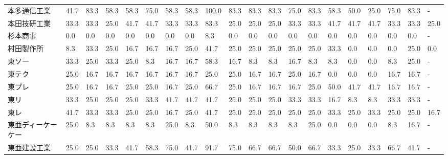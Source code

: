 \documentclass[a4paper，11pt]{jsarticle}
\begin{document}
\begin{longtable}[c]{lp{3mm}p{3mm}p{3mm}p{3mm}p{3mm}p{3mm}p{3mm}p{3mm}p{3mm}p{3mm}p{3mm}p{3mm}p{3mm}p{3mm}p{3mm}p{3mm}p{3mm}p{3mm}p{3mm}}
本多通信工業          &   41.7 &   83.3 &      58.3 &      58.3 &       75.0 &   58.3 &   58.3 &  100.0 &    83.3 &    83.3 &   83.3 &  75.0 &   83.3 &    58.3 &    50.0 &  25.0 &  75.0 &  83.3 &     - \\
本田技研工業          &   33.3 &   33.3 &      25.0 &      41.7 &       41.7 &   33.3 &   33.3 &   83.3 &    25.0 &    25.0 &   25.0 &  33.3 &   33.3 &    41.7 &    41.7 &  41.7 &  33.3 &  33.3 &  25.0 \\
杉本商事            &    0.0 &    0.0 &       0.0 &       0.0 &        0.0 &    0.0 &    0.0 &    8.3 &     0.0 &     0.0 &    0.0 &   0.0 &    0.0 &     0.0 &     0.0 &   0.0 &   0.0 &   0.0 &     - \\
村田製作所           &    8.3 &   33.3 &      25.0 &      16.7 &       16.7 &   16.7 &   25.0 &   41.7 &    25.0 &    25.0 &   25.0 &  25.0 &   25.0 &    33.3 &     0.0 &   0.0 &   0.0 &  25.0 &   0.0 \\
東ソー             &   33.3 &   25.0 &      33.3 &      25.0 &        8.3 &   16.7 &   16.7 &   58.3 &    16.7 &     8.3 &    8.3 &  16.7 &    8.3 &     8.3 &     0.0 &   0.0 &   8.3 &  25.0 &     - \\
東テク             &   25.0 &   16.7 &      16.7 &      16.7 &       16.7 &   16.7 &   16.7 &   25.0 &    25.0 &    16.7 &   16.7 &  25.0 &   16.7 &     0.0 &     0.0 &   0.0 &  16.7 &  16.7 &     - \\
東プレ             &   25.0 &   16.7 &      16.7 &      25.0 &       25.0 &   16.7 &   25.0 &   66.7 &    25.0 &    16.7 &   16.7 &  16.7 &   25.0 &    50.0 &    41.7 &  41.7 &  16.7 &  16.7 &     - \\
東リ              &   33.3 &   25.0 &      25.0 &      25.0 &       33.3 &   41.7 &   41.7 &   41.7 &    25.0 &    25.0 &   25.0 &  33.3 &   33.3 &    16.7 &     8.3 &   8.3 &  33.3 &  33.3 &     - \\
東レ              &   41.7 &   33.3 &      33.3 &      25.0 &       25.0 &   16.7 &   25.0 &   41.7 &    25.0 &    25.0 &   25.0 &  25.0 &   25.0 &    33.3 &    25.0 &  33.3 &  25.0 &  25.0 &  16.7 \\
東亜ディーケーケー       &   25.0 &    8.3 &       8.3 &       8.3 &        8.3 &   25.0 &    8.3 &   50.0 &     8.3 &     8.3 &    8.3 &   8.3 &   25.0 &     0.0 &     0.0 &   0.0 &   8.3 &  16.7 &     - \\
東亜建設工業          &   25.0 &   25.0 &      33.3 &      41.7 &       58.3 &   75.0 &   41.7 &   91.7 &    75.0 &    66.7 &   66.7 &  50.0 &   66.7 &    33.3 &    25.0 &  33.3 &  66.7 &  41.7 &     - \\

\end{longtable}
\end{document}
